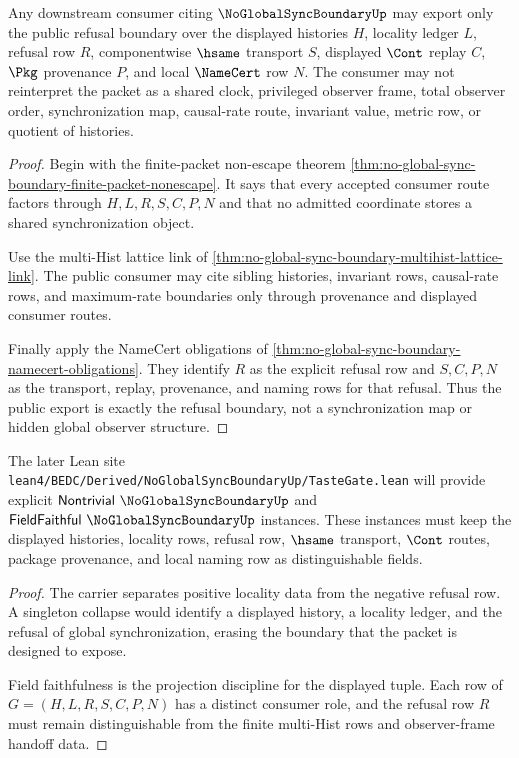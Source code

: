 \begin{theorem}
\label{thm:noglobalsyncboundary-public-consumer-theorem}
Any downstream consumer citing $\NoGlobalSyncBoundaryUp$ may export only the public refusal boundary over the displayed histories $H$, locality ledger $L$, refusal row $R$, componentwise $\hsame$ transport $S$, displayed $\Cont$ replay $C$, $\Pkg$ provenance $P$, and local $\NameCert$ row $N$. The consumer may not reinterpret the packet as a shared clock, privileged observer frame, total observer order, synchronization map, causal-rate route, invariant value, metric row, or quotient of histories.
\end{theorem}
\begin{proof}
Begin with the finite-packet non-escape theorem \autoref{thm:no-global-sync-boundary-finite-packet-nonescape}. It says that every accepted consumer route factors through $H,L,R,S,C,P,N$ and that no admitted coordinate stores a shared synchronization object.

Use the multi-Hist lattice link of \autoref{thm:no-global-sync-boundary-multihist-lattice-link}. The public consumer may cite sibling histories, invariant rows, causal-rate rows, and maximum-rate boundaries only through provenance and displayed consumer routes.

Finally apply the NameCert obligations of \autoref{thm:no-global-sync-boundary-namecert-obligations}. They identify $R$ as the explicit refusal row and $S,C,P,N$ as the transport, replay, provenance, and naming rows for that refusal. Thus the public export is exactly the refusal boundary, not a synchronization map or hidden global observer structure.
\end{proof}

\begin{theorem}
\label{thm:no-global-sync-boundary-tastegate-obligation}
The later Lean site \texttt{lean4/BEDC/Derived/NoGlobalSyncBoundaryUp/TasteGate.lean} will provide explicit $\mathsf{Nontrivial}\ \NoGlobalSyncBoundaryUp$ and $\mathsf{FieldFaithful}\ \NoGlobalSyncBoundaryUp$ instances. These instances must keep the displayed histories, locality rows, refusal row, $\hsame$ transport, $\Cont$ routes, package provenance, and local naming row as distinguishable fields.
\end{theorem}
\begin{proof}
The carrier separates positive locality data from the negative refusal row. A singleton collapse would identify a displayed history, a locality ledger, and the refusal of global synchronization, erasing the boundary that the packet is designed to expose.

Field faithfulness is the projection discipline for the displayed tuple. Each row of $G=(H,L,R,S,C,P,N)$ has a distinct consumer role, and the refusal row $R$ must remain distinguishable from the finite multi-Hist rows and observer-frame handoff data.
\end{proof}

